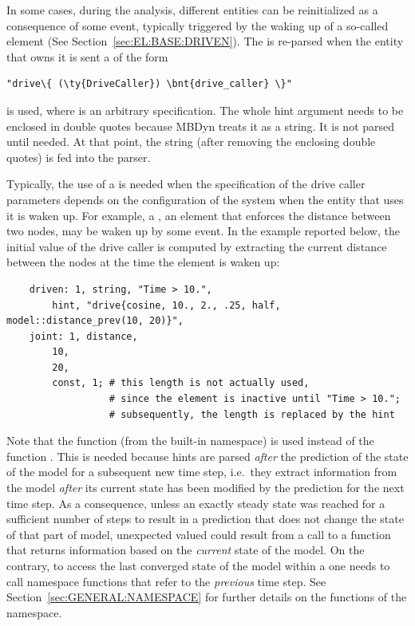 In some cases, during the analysis, different entities can be reinitialized
as a consequence of some event, typically triggered by the waking up 
of a so-called  element (See Section~\ref{sec:EL:BASE:DRIVEN}).
The  is re-parsed when the entity that owns it is sent
a  of the form
\begin{Verbatim}[commandchars=\\\{\}]
    "drive\{ (\ty{DriveCaller}) \bnt{drive_caller} \}"
\end{Verbatim}
is used, where  is an arbitrary 
specification.
The whole hint argument needs to be enclosed in double quotes because MBDyn
treats it as a string.
It is not parsed until needed.
At that point, the string (after removing the enclosing double quotes)
is fed into the parser.

Typically, the use of a  is needed when the specification of the
drive caller parameters depends on the configuration of the system when the
entity that uses it is waken up.
For example, a , an element that enforces the distance
between two nodes, may be waken up by some event.
In the example reported below, the initial value of the  drive caller
is computed by extracting the current distance between the nodes at the time
the element is waken up:
\begin{verbatim}
    driven: 1, string, "Time > 10.",
        hint, "drive{cosine, 10., 2., .25, half, model::distance_prev(10, 20)}",
    joint: 1, distance,
        10,
        20,
        const, 1; # this length is not actually used,
                  # since the element is inactive until "Time > 10.";
                  # subsequently, the length is replaced by the hint
\end{verbatim}
Note that the function 
(from the built-in  namespace)
is used instead of the function .
This is needed because hints are parsed \emph{after} the prediction
of the state of the model for a subsequent new time step,
i.e.\ they extract information from the model
\emph{after} its current state has been modified by the prediction
for the next time step.
As a consequence, unless an exactly steady state was reached
for a sufficient number of steps to result in a prediction
that does not change the state of that part of model,
unexpected valued could result from a call to a function that returns
information based on the \emph{current} state of the model.
On the contrary, to access the last converged state of the model
within a  one needs to call  namespace functions
that refer to the \emph{previous} time step.
See Section~\ref{sec:GENERAL:NAMESPACE} for further details
on the functions of the  namespace.



